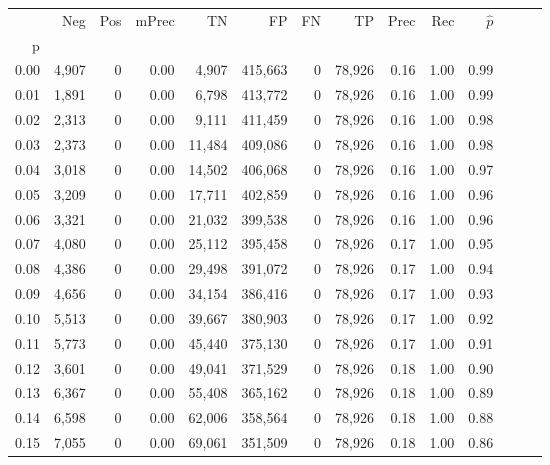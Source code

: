\begin{tabular}{rrrrrrrrrrrrrr}
\toprule
{} &    Neg &    Pos & mPrec &       TN &       FP &      FN &      TP &  Prec &   Rec & $\hat{p}$ \\
p    &        &        &       &          &          &         &         &       &       &           \\
\midrule
0.00 &  4,907 &      0 &  0.00 &    4,907 &  415,663 &       0 &  78,926 &  0.16 &  1.00 &      0.99 \\
0.01 &  1,891 &      0 &  0.00 &    6,798 &  413,772 &       0 &  78,926 &  0.16 &  1.00 &      0.99 \\
0.02 &  2,313 &      0 &  0.00 &    9,111 &  411,459 &       0 &  78,926 &  0.16 &  1.00 &      0.98 \\
0.03 &  2,373 &      0 &  0.00 &   11,484 &  409,086 &       0 &  78,926 &  0.16 &  1.00 &      0.98 \\
0.04 &  3,018 &      0 &  0.00 &   14,502 &  406,068 &       0 &  78,926 &  0.16 &  1.00 &      0.97 \\
0.05 &  3,209 &      0 &  0.00 &   17,711 &  402,859 &       0 &  78,926 &  0.16 &  1.00 &      0.96 \\
0.06 &  3,321 &      0 &  0.00 &   21,032 &  399,538 &       0 &  78,926 &  0.16 &  1.00 &      0.96 \\
0.07 &  4,080 &      0 &  0.00 &   25,112 &  395,458 &       0 &  78,926 &  0.17 &  1.00 &      0.95 \\
0.08 &  4,386 &      0 &  0.00 &   29,498 &  391,072 &       0 &  78,926 &  0.17 &  1.00 &      0.94 \\
0.09 &  4,656 &      0 &  0.00 &   34,154 &  386,416 &       0 &  78,926 &  0.17 &  1.00 &      0.93 \\
0.10 &  5,513 &      0 &  0.00 &   39,667 &  380,903 &       0 &  78,926 &  0.17 &  1.00 &      0.92 \\
0.11 &  5,773 &      0 &  0.00 &   45,440 &  375,130 &       0 &  78,926 &  0.17 &  1.00 &      0.91 \\
0.12 &  3,601 &      0 &  0.00 &   49,041 &  371,529 &       0 &  78,926 &  0.18 &  1.00 &      0.90 \\
0.13 &  6,367 &      0 &  0.00 &   55,408 &  365,162 &       0 &  78,926 &  0.18 &  1.00 &      0.89 \\
0.14 &  6,598 &      0 &  0.00 &   62,006 &  358,564 &       0 &  78,926 &  0.18 &  1.00 &      0.88 \\
0.15 &  7,055 &      0 &  0.00 &   69,061 &  351,509 &       0 &  78,926 &  0.18 &  1.00 &      0.86 \\

\end{tabular}
